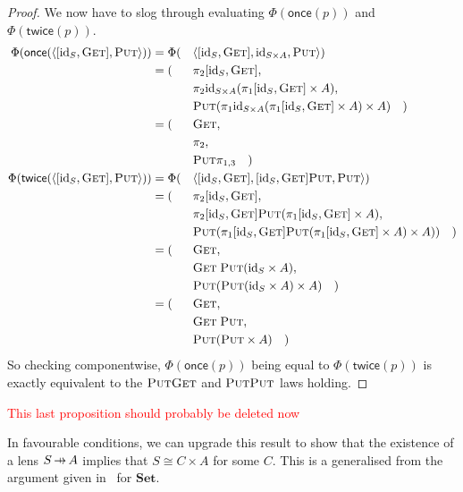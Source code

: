 \documentclass[11pt,a4paper]{article}
\theoremstyle{plain}
\theoremstyle{definition}
\newcommand{\Set}{\mathbf{Set}}
\newcommand{\id}{\mathrm{id}}
\newcommand{\fget}{\textsc{Get}}
\newcommand{\fput}{\textsc{Put}}
\newcommand{\once}{\mathsf{once}}
\newcommand{\twice}{\mathsf{twice}}
\newcommand{\hto}{\ensuremath{\,\mathaccent\shortmid\rightarrow\,}}
\newcommand{\todo}[1]{\textcolor{red}{\small #1}}
\begin{document}
\begin{proof}
  We now have to slog through evaluating $\Phi(\once(p))$ and $\Phi(\twice(p))$.
  \begin{alignat*}{3}
    \Phi(\once(\langle [\id_S, \fget],  \fput \rangle)) &=
    \Phi(&&\langle [\id_S, \fget], \id_{S \times A}, \fput \rangle) \\
    &= (&&\pi_2 [\id_S, \fget], \\
    &&&\pi_2 \id_{S \times A} (\pi_1 [\id_S, \fget] \times A), \\
    &&& \fput (\pi_1 \id_{S \times A} (\pi_1 [\id_S, \fget] \times A) \times A) \quad) \\
    &= (&&\fget, \\
    &&& \pi_2, \\
    &&& \fput \pi_{1,3} \quad) \\
    \Phi(\twice(\langle [\id_S, \fget],  \fput \rangle)) &=
    \Phi(&&\langle [\id_S, \fget], [\id_S, \fget]\fput, \fput \rangle) \\
    &= (&&\pi_2 [\id_S, \fget], \\
    &&&\pi_2 [\id_S, \fget]\fput (\pi_1 [\id_S, \fget] \times A), \\
    &&& \fput (\pi_1 [\id_S, \fget]\fput (\pi_1 [\id_S, \fget] \times A) \times A)) \quad) \\
    &= (&&\fget, \\
    &&& \fget \; \fput (\id_S \times A), \\
    &&& \fput (\fput (\id_S \times A) \times A) \quad) \\
    &= (&&\fget, \\
    &&& \fget \; \fput, \\
    &&& \fput (\fput \times A) \quad)
  \end{alignat*}
  So checking componentwise, $\Phi(\once(p))$ being equal to $\Phi(\twice(p))$ is exactly equivalent to the $\fput\fget$ and $\fput\fput$ laws holding.
\end{proof}

\todo{This last proposition should probably be deleted now}

In favourable conditions, we can upgrade this result to show that the existence of a lens $S \hto A$ implies that $S \cong C \times A$ for some $C$. This is a generalised from the argument given in~\cite[Corollary 13]{AlgebrasAndUpdateStrategies} for $\Set$.
\end{document}
